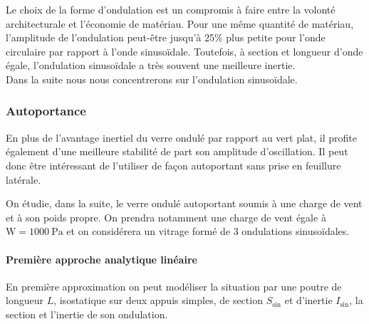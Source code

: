 \documentclass[11pt,titlepage]{article}
\begin{document}
  Le choix de la forme d'ondulation est un compromis à faire entre la volonté architecturale et l'économie de matériau. Pour une même quantité de matériau, l'amplitude de l'ondulation peut-être jusqu'à 25\% plus petite pour l'onde circulaire par rapport à l'onde sinusoïdale. Toutefois, à  section et longueur d'onde égale, l'ondulation sinusoïdale a très souvent une meilleure inertie.
  \\
  
Dans la suite nous nous concentrerons sur l'ondulation sinusoïdale.
\subsubsection{Autoportance}
En plus de l'avantage inertiel du verre ondulé par rapport au vert plat, il profite également d'une meilleure stabilité de part son amplitude d'oscillation. Il peut donc être intéressant de l'utiliser de façon autoportant sans prise en feuillure latérale. 

On étudie, dans la suite, le verre ondulé autoportant soumis à une charge de vent et à son poids propre. On prendra notamment une charge de vent égale à $\text{W} = \qty{1000}{\pascal}$ et on considérera un vitrage formé de 3 ondulations sinusoïdales.


\paragraph{Première approche analytique linéaire}\mbox{}

En première approximation on peut modéliser la situation par une poutre de longueur $L$, isostatique sur deux appuis simples, de section $S_{\text{sin}}$ et d'inertie $I_{\text{sin}}$, la section et l'inertie de son ondulation.
\end{document}
